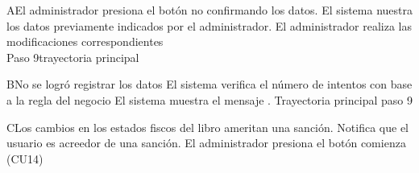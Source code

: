 			
		\begin{UCtrayectoriaA}{A}{El administrador presiona el botón  no confirmando los datos.}
			\UCpaso[\UCsist] El sistema nuestra los datos previamente indicados por el administrador.
			\UCpaso[\UCactor] El administrador realiza las modificaciones correspondientes 
			\\ Paso 9trayectoria principal 
		\end{UCtrayectoriaA}
		\begin{UCtrayectoriaA}{B}{No se logró registrar los datos }
			\UCpaso[\UCsist] El sistema verifica el número de intentos con base a la regla del negocio 
			\UCpaso[\UCsist] El sistema muestra el mensaje .
			Trayectoria principal paso 9
		\end{UCtrayectoriaA}
		\begin{UCtrayectoriaA}{C}{Los cambios en los estados fiscos del libro ameritan una sanción. }
			\UCpaso[\UCsist] Notifica que el usuario es acreedor de una sanción.
			\UCpaso[\UCsist] El administrador presiona el botón 
			\UCpaso[\UCsist] comienza \UCref(CU14)
		\end{UCtrayectoriaA}
	


			
			
			

			
			
			
			
